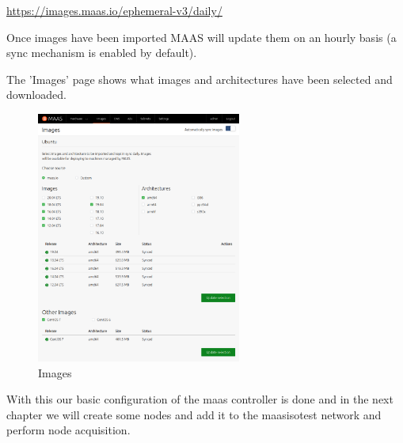 \url{https://images.maas.io/ephemeral-v3/daily/}

Once images have been imported MAAS will update them on an hourly basis (a sync mechanism is enabled by default).

The 'Images' page shows what images and architectures have been selected and downloaded.

\begin{figure}[!ht]
    \centering
    \includegraphics[width=0.6\textwidth]{images/4-11.png}
    \caption{Images}
\end{figure}


With this our basic configuration of the maas controller is done and in the next chapter we will create some nodes and add it to the maasisotest network and perform node acquisition.